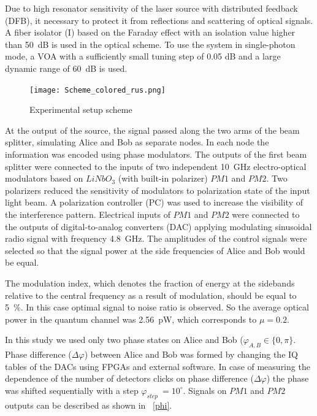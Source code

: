 Due to high resonator sensitivity of the laser source with distributed feedback (DFB), it necessary to protect it from reflections and scattering of optical signals. A fiber isolator (I) based on the Faraday effect with an isolation value higher than 50~dB is used in the optical scheme. To use the system in single-photon mode, a VOA with a sufficiently small tuning step of 0.05 dB and a large dynamic range of 60~dB is used.

  

  \begin{figure}[ht]
  \centering
  \texttt{[image: Scheme\_colored\_rus.png]}
  \caption{Experimental setup scheme}
  \label{fig:RF_sin}
\end{figure}

  
 
  
At the output of the source, the signal passed along the two arms of the beam splitter, simulating Alice and Bob as separate nodes. In each node the information was encoded using phase modulators. The outputs of the first beam splitter were connected to the inputs of two independent 10~GHz electro-optical modulators based on $LiNbO_3$ (with built-in polarizer) $PM1$ and $PM2$. Two polarizers reduced the sensitivity of modulators to polarization state of the input light beam. A polarization controller (PC) was used to increase the visibility of the interference pattern. Electrical inputs of $PM1$ and $PM2$ were connected to the outputs of digital-to-analog converters (DAC) applying modulating sinusoidal radio signal with frequency 4.8~GHz. The amplitudes of the control signals were selected so that the signal power at the side frequencies of Alice and Bob would be equal.

The modulation index, which denotes the fraction of energy at the sidebands relative to the central frequency as a result of modulation, should be equal to 5~\%. In this case optimal signal to noise ratio is observed. So the average optical power in the quantum channel was 2.56~pW, which corresponds to $\mu=0.2$.  


In this study we used only two phase states on Alice and Bob ($\varphi_{A,B}\in\{0,\pi\}$. Phase difference ($\Delta\varphi$) between Alice and Bob was formed by changing the IQ tables of the DACs using FPGAs and external software. In case of measuring the dependence of the number of detectors clicks on phase difference ($\Delta\varphi$) the phase was shifted sequentially with a step $\varphi_{step}\ = 10^{\circ}$. Signals on $PM1$ and $PM2$ outputs can be described as shown in ~\ref{phi}.

